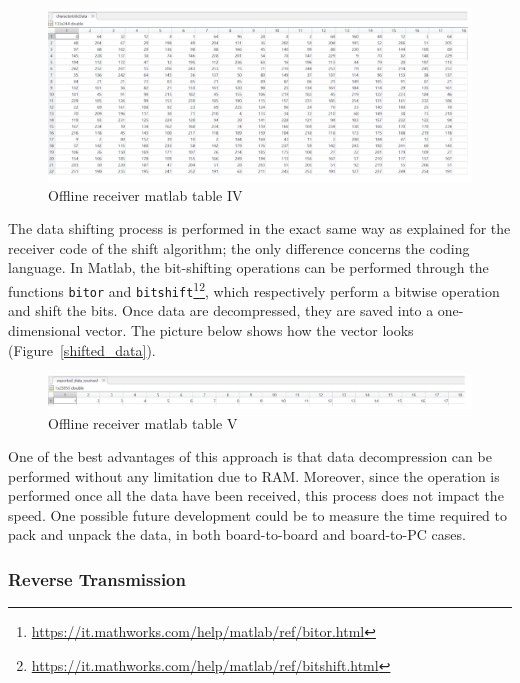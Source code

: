 \documentclass{Configuration_Files/PoliMi3i_thesis}
\begin{document}
\begin{figure}[H]
    \centering
    \includegraphics[scale=0.6]{Board Windows PC/7.png}
    \caption{Offline receiver matlab table IV}
    \label{boardwindows_7}
\end{figure}

The data shifting process is performed in the exact same way as explained for the receiver code of the shift algorithm; the only difference concerns the coding language. In Matlab, the bit-shifting operations can be performed through the functions \texttt{bitor} and \texttt{bitshift}\footnote{\url{https://it.mathworks.com/help/matlab/ref/bitor.html}}\footnote{\url{https://it.mathworks.com/help/matlab/ref/bitshift.html}}, which respectively perform a bitwise operation and shift the bits. Once data are decompressed, they are saved into a one-dimensional vector. The picture below shows how the vector looks (Figure~\ref{shifted_data}).

\begin{figure}[H]
    \centering
    \includegraphics[scale=0.6]{Board Windows PC/8.png}
    \caption{Offline receiver matlab table V}
    \label{boardwindows_8}
\end{figure}

One of the best advantages of this approach is that data decompression can be performed without any limitation due to RAM. Moreover, since the operation is performed once all the data have been received, this process does not impact the speed. One possible future development could be to measure the time required to pack and unpack the data, in both board-to-board and board-to-PC cases.

\subsubsection{Reverse Transmission}
\end{document}
